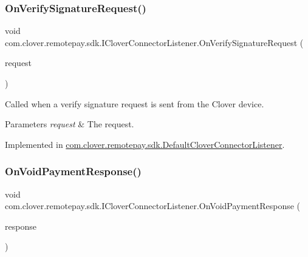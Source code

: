 \subsubsection{\texorpdfstring{On\+Verify\+Signature\+Request()}{OnVerifySignatureRequest()}}
{\footnotesize\ttfamily void com.\+clover.\+remotepay.\+sdk.\+I\+Clover\+Connector\+Listener.\+On\+Verify\+Signature\+Request (\begin{DoxyParamCaption}\item[{\hyperlink{classcom_1_1clover_1_1remotepay_1_1sdk_1_1_verify_signature_request}{Verify\+Signature\+Request}}]{request }\end{DoxyParamCaption})}



Called when a verify signature request is sent from the Clover device. 


\begin{DoxyParams}{Parameters}
{\em request} & The request.\\
\hline
\end{DoxyParams}


Implemented in \hyperlink{classcom_1_1clover_1_1remotepay_1_1sdk_1_1_default_clover_connector_listener_a730846aaee619b9c0c6bf737ef4ff5e2}{com.\+clover.\+remotepay.\+sdk.\+Default\+Clover\+Connector\+Listener}.

\mbox{\label{interfacecom_1_1clover_1_1remotepay_1_1sdk_1_1_i_clover_connector_listener_adc94ebf628d9ad0bf3f2b537f1de30f2}} 
\subsubsection{\texorpdfstring{On\+Void\+Payment\+Response()}{OnVoidPaymentResponse()}}
{\footnotesize\ttfamily void com.\+clover.\+remotepay.\+sdk.\+I\+Clover\+Connector\+Listener.\+On\+Void\+Payment\+Response (\begin{DoxyParamCaption}\item[{\hyperlink{classcom_1_1clover_1_1remotepay_1_1sdk_1_1_void_payment_response}{Void\+Payment\+Response}}]{response }\end{DoxyParamCaption})}



